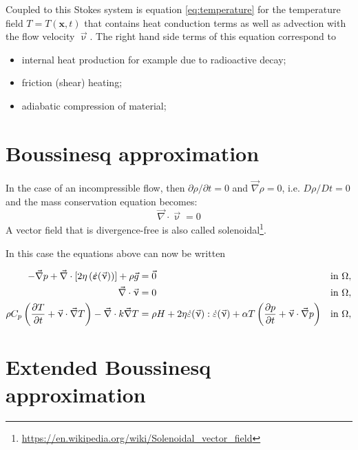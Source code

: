 \documentclass[a4paper]{article}
\begin{document}
Coupled to this Stokes system is equation \eqref{eq:temperature} for the
temperature field $T=T(\mathbf x,t)$ that contains heat conduction terms as
well as advection with the flow velocity $\vec{\upnu}$. The right hand side
terms of this equation correspond to
\begin{itemize}
\item internal heat production for example due to radioactive decay;
\item friction (shear) heating;
\item adiabatic compression of material;
\end{itemize}


\section{Boussinesq approximation}

In the case of an incompressible flow, then $\partial \rho/\partial t=0$ and
${\vec \nabla}\rho=0$, i.e. $D\rho/Dt=0$ and the mass conservation equation becomes:
\[
{\vec \nabla}\cdot{\vec \upnu} = 0
\]
A vector field that is divergence-free is also called
solenoidal\footnote{\url{https://en.wikipedia.org/wiki/Solenoidal_vector_field}}.

In this case the equations above can now be written

\begin{align}
  \label{eq:stokes-1}
  - \vec\nabla p +  
  \vec\nabla \cdot \left[2\eta \left(\dot{\bm \varepsilon}(\vec \upnu)  \right)
                \right] +  \rho \vec g &= \vec{0}
  &
  & \textrm{in $\Omega$},
  \\
  \label{eq:stokes-2}
  \vec\nabla \cdot \vec \upnu &= 0
  &
  & \textrm{in $\Omega$},
  \\
  \label{eq:temperature}
  \rho C_p \left(\frac{\partial T}{\partial t} + \vec \upnu\cdot\vec\nabla T\right)
  - \vec\nabla\cdot k\vec\nabla T
  &=
  \rho H
  +
  2\eta \dot\varepsilon(\vec\upnu) : \dot\varepsilon(\vec\upnu) 
  +\alpha T \left( \frac{\partial p}{\partial t} +  \vec \upnu \cdot \vec\nabla p \right)
  && \textrm{in $\Omega$},
  \notag
\end{align}





\section{Extended Boussinesq approximation}









\newpage
\printbibliography
\end{document}
